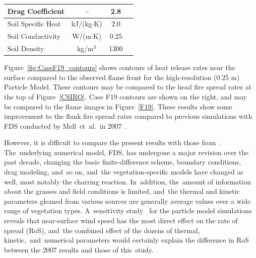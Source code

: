 \documentclass[atmosphere,article,accept,moreauthors,pdftex]{Definitions/mdpi}
\begin{document}
\begin{paracol}{2}
\begin{specialtable}[H]
\begin{tabular}{lccc}
Drag Coefficient                & --                    & 2.8                       & \cite{Falkenstein-Smith:2018}         \\ \midrule 
Soil Specific Heat              & kJ/(kg$\cdot$K)       & 2.0                       & \cite{Farouki:1981}                   \\ \midrule
Soil Conductivity               & W/(m$\cdot$K)         & 0.25                      & \cite{Farouki:1981}                   \\ \midrule
Soil Density                    & kg/m$^3$              & 1300                      & \cite{Farouki:1981}                   \\ \bottomrule

\end{tabular}
\end{specialtable}

Figure~\ref{fig:CaseF19_contours} shows contours of heat release rates near the surface compared to the observed flame front for the high-resolution (0.25 m) Particle Model.  These contours may be compared to the head fire spread rates at the top of Figure~\ref{CSIRO}.  Case F19 contours are shown on the right, and may be compared to the flame images in Figure~\ref{F19}.  These results show some improvement to the flank fire spread rates compared to previous simulations with FDS conducted by Mell~et~al.~in 2007~\cite{Mell:IJWF2007}.

However, it is difficult to compare the present results with those from~\cite{Mell:IJWF2007}. The~underlying numerical model, FDS, has undergone a major revision over the past decade, changing the basic finite-difference scheme, boundary conditions, drag modeling, and~so on, and~the vegetation-specific models have changed as well, most notably the charring reaction. In~addition, the~amount of information about the grasses and field conditions is limited, and~the thermal and kinetic parameters gleaned from various sources are generally average values over a wide range of vegetation types. A~sensitivity study~\cite{McGrattan:CI2017} for the particle model simulations reveals that near-surface wind speed has the most direct effect on the rate of spread (RoS), and~the combined effect of the dozens of thermal, \mbox{kinetic, and~numerical} parameters would certainly explain the difference in RoS between the 2007 results and those of this~study. 



\end{paracol}
\end{document}
